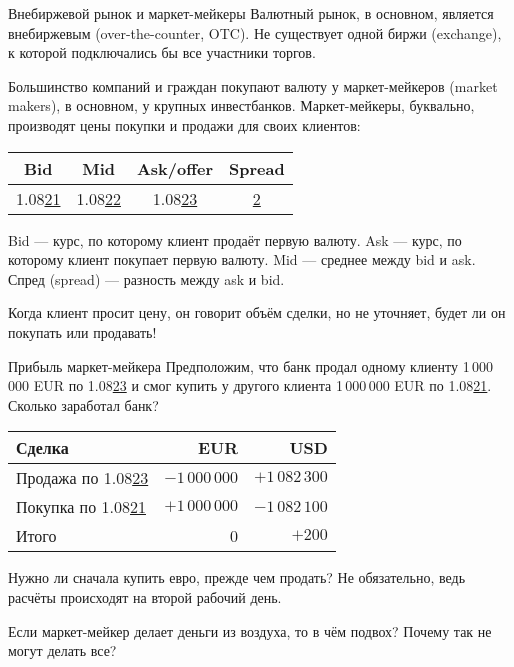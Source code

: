 \documentclass{beamer}
\newcommand{\eurusdBigFigures}{1.08}
\newcommand{\eurusdBigFiguresPerMillion}{1\,08}
\begin{document}
\begin{frame}{Внебиржевой рынок и маркет-мейкеры}
\justify
Валютный рынок, в основном, является \alert{внебиржевым} (over-the-counter, OTC). Не 
существует одной биржи (exchange), к которой подключались бы все участники торгов.

\justify
Большинство компаний и граждан покупают валюту у маркет-мейкеров (market makers), в 
основном, у крупных инвестбанков. Маркет-мейкеры, буквально, производят цены покупки 
и продажи для своих клиентов:

\centering
\begin{tabular}{c|c|c|c}
Bid & Mid & Ask/offer & Spread \\ \hline
\eurusdBigFigures\underline{21} & \eurusdBigFigures\underline{22} & \eurusdBigFigures\underline{23} & \underline{2}
\end{tabular}

\justify
Bid --- курс, по которому клиент продаёт первую валюту. Ask --- курс, по которому клиент 
покупает первую валюту. Mid --- среднее между bid и ask. Спред (spread) --- разность между 
ask и bid.

\justify
Когда клиент просит цену, он говорит объём сделки, но не уточняет, будет ли он покупать или продавать!
\end{frame}



\begin{frame}{Прибыль маркет-мейкера}
\justify
Предположим, что банк продал одному клиенту 1\,000\,000 EUR по \eurusdBigFigures\underline{23} и
смог купить у другого клиента 1\,000\,000 EUR по \eurusdBigFigures\underline{21}. Сколько 
заработал банк?

\centering
\begin{tabular}{l|r|r}
Сделка & EUR & USD \\
\hline
Продажа по \eurusdBigFigures\underline{23} & $-1\,000\,000$ & $+\eurusdBigFiguresPerMillion2\,300$ \\
Покупка по \eurusdBigFigures\underline{21} & $+1\,000\,000$ & $-\eurusdBigFiguresPerMillion2\,100$ \\
\hline
Итого & 0 & $+200$
\end{tabular}

\justify
Нужно ли сначала купить евро, прежде чем продать? Не обязательно, ведь расчёты 
происходят на второй рабочий день.

\justify
Если маркет-мейкер делает деньги из воздуха, то в чём подвох? Почему так не могут
делать все?
\end{frame}
\end{document}
